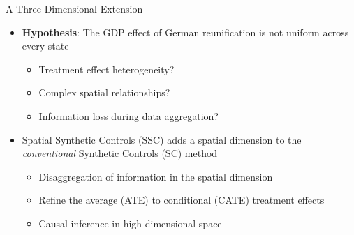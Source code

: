 \begin{frame}{A Three-Dimensional Extension}

\begin{itemize}
\item{\textbf{Hypothesis}: The GDP effect of German reunification is not uniform across every state}
    \begin{itemize}
        \item{Treatment effect heterogeneity?}
        \vspace{-5pt}
        \item{Complex spatial relationships?}
        \vspace{-5pt}
        \item{Information loss during data aggregation?}
    \end{itemize}
\end{itemize}

\hfill

\begin{itemize}
    \item{Spatial Synthetic Controls (SSC) adds a spatial dimension to the \textit{conventional} Synthetic Controls (SC) method}
    \begin{itemize}
        \item{Disaggregation of information in the spatial dimension}
        \vspace{-5pt}
        \item{Refine the average (ATE) to conditional (CATE) treatment effects}
        \vspace{-5pt}
        \item{Causal inference in high-dimensional space}
    \end{itemize}
\end{itemize}
\end{frame}

